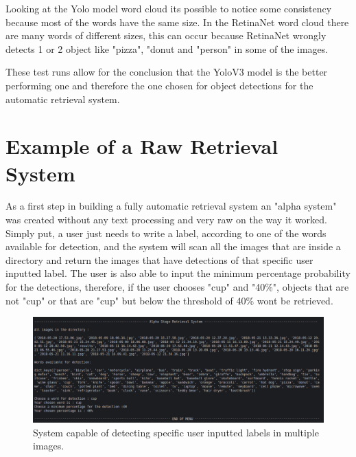      Looking at the Yolo model word cloud its possible to notice some consistency because most of the words have the same size. In the RetinaNet word cloud there are many words of different sizes, this can occur because RetinaNet wrongly detects 1 or 2 object like "pizza", "donut and "person" in some of the images.

     These test runs allow for the conclusion that the YoloV3 model is the better performing one and therefore the one chosen for object detections for the automatic retrieval system. 

\section{Example of a Raw Retrieval System}
\label{sec:alpha_retrieval}

As a first step in building a fully automatic retrieval system an "alpha system" was created without any text processing and very raw on the way it worked. Simply put, a user just needs to write a label, according to one of the words available for detection, and the system will scan all the images that are inside a directory and return the images that have detections of that specific user inputted label. The user is also able to input the minimum percentage probability for the detections, therefore, if the user chooses "cup" and "40\%", objects that are not "cup" or that are "cup" but below the threshold of 40\% wont be retrieved.

\begin{figure}[H]
  \centering
  \includegraphics[width = \textwidth]{Sections/4InitialWork/4_images_random/alpha.png}
  \caption[Raw retrieval system]{System capable of detecting specific user inputted labels in multiple images. }
  \label{fig:yolov3} 
\end{figure}




